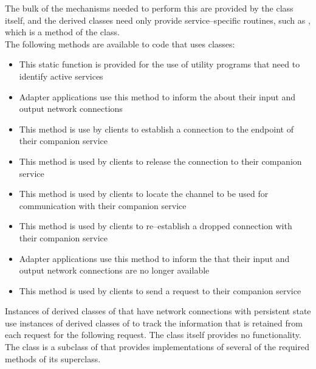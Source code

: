 The bulk of the mechanisms needed to perform this are provided by the
 class itself, and the derived classes need only
provide service--specific routines, such as ,
which is a method of the  class.\\

The following methods are available to code that uses
 classes:
\begin{itemize}
\item {} This static function is provided for the use of
utility programs that need to identify active services
\item {} Adapter applications use this method to inform the
 about their input and output \yarp{}
network connections
\item {} This method is use by clients to establish a
connection to the endpoint of their companion service
\item {} This method is used by clients to release the
connection to their companion service
\item {} This method is used by clients to locate the channel to be
used for communication with their companion service
\item {} This method is used by clients to re--establish
a dropped connection with their companion service
\item {} Adapter applications use this method to inform
the  that their input and output
\yarp{} network connections are no longer available
\item {} This method is used by clients to send a request to their
companion service
\end{itemize}
Instances of derived classes of  that have \yarp{}
network connections with persistent state use instances of
derived classes of  to track
the information that is retained from each request for the following request.
The  class itself provides no functionality.
The 
class is a subclass of 
that provides implementations of several of the required methods of its superclass.\\

